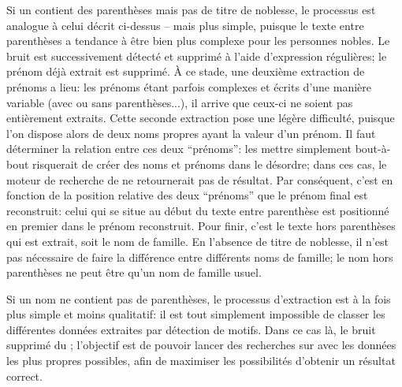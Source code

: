 Si un \tname{} contient des parenthèses mais pas de titre de noblesse, le processus est analogue à celui décrit ci-dessus -- mais plus simple, puisque le texte entre parenthèses a tendance à être bien plus complexe pour les personnes nobles. Le bruit est successivement détecté et supprimé à l'aide d'\glspl{expression régulière}; le prénom déjà extrait est supprimé. À ce stade, une deuxième extraction de prénoms a lieu: les prénoms étant parfois complexes et écrits d'une manière variable (avec ou sans parenthèses...), il arrive que ceux-ci ne soient pas entièrement extraits. Cette seconde extraction pose une légère difficulté, puisque l'on dispose alors de deux noms propres ayant la valeur d'un prénom. Il faut déterminer la relation entre ces deux \enquote{prénoms}: les mettre simplement bout-à-bout risquerait de créer des noms et prénoms dans le désordre; dans ces cas, le moteur de recherche de \wkd{} ne retournerait pas de résultat. Par conséquent, c'est en fonction de la position relative des deux \enquote{prénoms} que le prénom final est reconstruit: celui qui se situe au début du texte entre parenthèse est positionné en premier dans le prénom reconstruit. Pour finir, c'est le texte hors parenthèses qui est extrait, soit le nom de famille. En l'absence de titre de noblesse, il n'est pas nécessaire de faire la différence entre différents noms de famille; le nom hors parenthèses ne peut être qu'un nom de famille usuel.

Si un nom ne contient pas de parenthèses, le processus d'extraction est à la fois plus simple et moins qualitatif: il est tout simplement impossible de classer les différentes données extraites par détection de motifs. Dans ce cas là, le bruit supprimé du \tname{}; l'objectif est de pouvoir lancer des recherches sur \wkd{} avec les données les plus propres possibles, afin de maximiser les possibilités d'obtenir un résultat correct.

